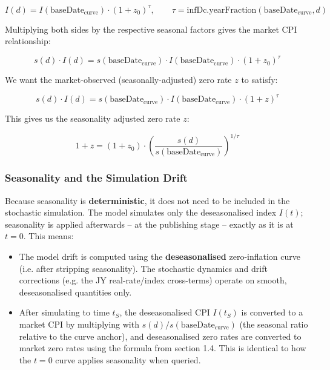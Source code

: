 \documentclass[11pt,a4paper]{article}
\begin{document}
\begin{equation}
I(d) = I(\text{baseDate}_{\text{curve}}) \cdot (1 + z_0)^{\tau}, \qquad \tau = \text{infDc.yearFraction}(\text{baseDate}_{\text{curve}}, d)
\end{equation}

Multiplying both sides by the respective seasonal factors gives the market CPI relationship:

\begin{equation}
s(d) \cdot I(d) = s(\text{baseDate}_{\text{curve}}) \cdot I(\text{baseDate}_{\text{curve}}) \cdot (1 + z_0)^{\tau}
\end{equation}

We want the market-observed (seasonally-adjusted) zero rate $z$ to satisfy:

\begin{equation}
s(d) \cdot I(d) = s(\text{baseDate}_{\text{curve}}) \cdot I(\text{baseDate}_{\text{curve}}) \cdot (1 + z)^{\tau}
\end{equation}

This gives us the seasonality adjusted zero rate $z$:

\begin{equation}
\boxed{1 + z = (1 + z_0) \cdot \left(\frac{s(d)}{s(\text{baseDate}_{\text{curve}})}\right)^{1/\tau}}
\end{equation}

\subsubsection{Seasonality and the Simulation Drift}

Because seasonality is \textbf{deterministic}, it does not need to be included in the stochastic simulation. The model simulates only the deseasonalised index $I(t)$; seasonality is applied afterwards -- at the publishing stage -- exactly as it is at $t=0$. This means:

\begin{itemize}
\item The model drift is computed using the \textbf{deseasonalised} zero-inflation curve (i.e. after stripping seasonality). The stochastic dynamics and drift corrections (e.g. the JY real-rate/index cross-terms) operate on smooth, deseasonalised quantities only.
\item After simulating to time $t_S$, the deseasonalised CPI $I(t_S)$ is converted to a market CPI by multiplying with $s(d)/s(\text{baseDate}_{\text{curve}})$ (the seasonal ratio relative to the curve anchor), and deseasonalised zero rates are converted to market zero rates using the formula from section 1.4. This is identical to how the $t=0$ curve applies seasonality when queried.
\end{itemize}
\end{document}
